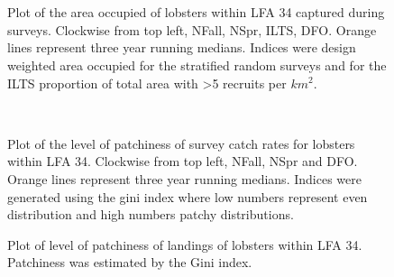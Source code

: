 \documentclass[11pt]{article}
\newcommand{\e}{/SpinDr/backup/bio_data/bio.lobster/figures/LFA3438Framework2019/} %
\begin{document}
\begin{figure}
        \centering
    \\
                \\
        
         \caption{Plot of the area occupied of lobsters within LFA 34 captured during surveys. Clockwise from top left, NFall, NSpr, ILTS, DFO.
         Orange lines represent three year running medians. Indices were design weighted area occupied for the stratified random surveys and for the ILTS proportion of total area with \textgreater 5 recruits per $km^2$.}
        \end{figure}

    
\begin{figure}
        \centering
    \\
        
         \caption{Plot of the level of patchiness of survey catch rates for lobsters within LFA 34. Clockwise from top left, NFall, NSpr and DFO.
         Orange lines represent three year running medians. Indices were generated using the gini index where low numbers represent even distribution and high numbers patchy distributions.}
        \end{figure}

\begin{figure}
    \centering
        \caption{Plot of level of patchiness of landings of lobsters within LFA 34. Patchiness was estimated by the Gini index.}

    \end{figure}
\end{document}
